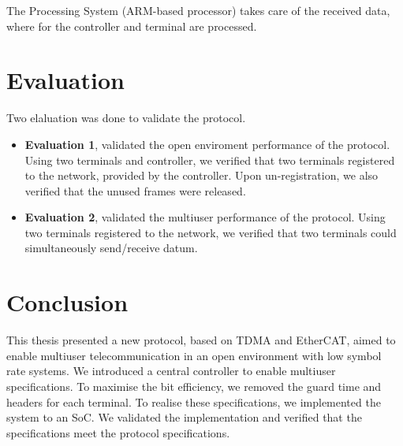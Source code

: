 ﻿\documentclass[twocolumn,9pt]{ltjsarticle}
\renewcommand{\ref}{\Cref}
\begin{document}
The Processing System (ARM\textregistered -based processor) takes care of the received data, where for the controller and terminal are processed.

\section{Evaluation}
Two elaluation was done to validate the protocol.
\begin{itemize}
\item \textbf{Evaluation 1}, validated the open enviroment performance of the protocol.
  Using two terminals and controller, we verified that two terminals registered to the network, provided by the controller.
  Upon un-registration, we also verified that the unused frames were released.
\item \textbf{Evaluation 2}, validated the multiuser performance of the protocol.
  Using two terminals registered to the network, we verified that two terminals could simultaneously send/receive datum.
\end{itemize}

\section{Conclusion}
This thesis presented a new protocol, based on TDMA and EtherCAT, aimed to enable multiuser telecommunication in an open environment with low symbol rate systems.
We introduced a central controller to enable multiuser specifications.
To maximise the bit efficiency, we removed the guard time and headers for each terminal.
To realise these specifications, we implemented the system to an SoC.
We validated the implementation and verified that the specifications meet the protocol specifications.
\end{document}
